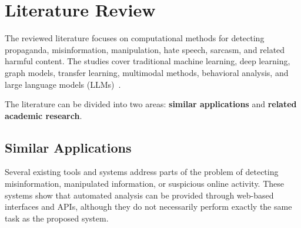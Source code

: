 \section{Literature Review}
The reviewed literature focuses on computational methods for detecting propaganda,
misinformation, manipulation, hate speech, sarcasm, and related harmful content.
The studies cover traditional machine learning, deep learning, graph models,
transfer learning, multimodal methods, behavioral analysis, and large language
models (LLMs)~\cite{duridi2025,plikynas2025,ahmad2025,schneider2026}.

The literature can be divided into two areas: \textbf{similar applications} and
\textbf{related academic research}.

\subsection{Similar Applications}
Several existing tools and systems address parts of the problem of detecting
misinformation, manipulated information, or suspicious online activity. These
systems show that automated analysis can be provided through web-based interfaces
and APIs, although they do not necessarily perform exactly the same task as the
proposed system.
